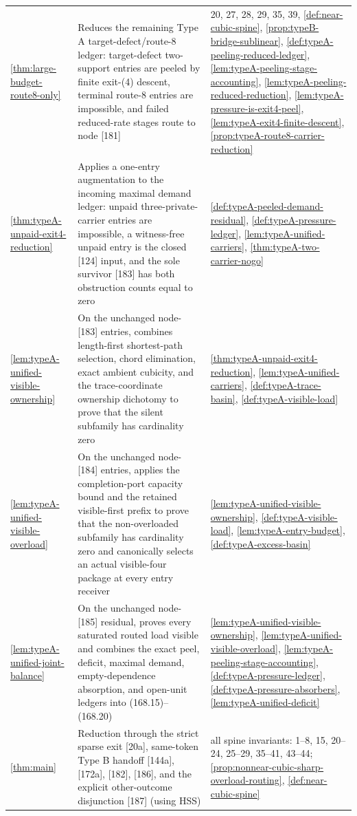 \documentclass[11pt]{article}
\begin{document}
{\begin{longtable}{L{0.31\textwidth} L{0.42\textwidth} L{0.17\textwidth}}
\cref{thm:large-budget-route8-only} & Reduces the remaining Type A target-defect/route-8 ledger: target-defect two-support entries are peeled by finite exit-\textup{(4)} descent, terminal route-8 entries are impossible, and failed reduced-rate stages route to node [181] & 20, 27, 28, 29, 35, 39, \cref{def:near-cubic-spine}, \cref{prop:typeB-bridge-sublinear}, \cref{def:typeA-peeling-reduced-ledger}, \cref{lem:typeA-peeling-stage-accounting}, \cref{lem:typeA-peeling-reduced-reduction}, \cref{lem:typeA-pressure-is-exit4-peel}, \cref{lem:typeA-exit4-finite-descent}, \cref{prop:typeA-route8-carrier-reduction} \\
\cref{thm:typeA-unpaid-exit4-reduction} & Applies a one-entry augmentation to the incoming maximal demand ledger: unpaid three-private-carrier entries are impossible, a witness-free unpaid entry is the closed [124] input, and the sole survivor [183] has both obstruction counts equal to zero & \cref{def:typeA-peeled-demand-residual}, \cref{def:typeA-pressure-ledger}, \cref{lem:typeA-unified-carriers}, \cref{thm:typeA-two-carrier-nogo} \\
\cref{lem:typeA-unified-visible-ownership} & On the unchanged node-[183] entries, combines length-first shortest-path selection, chord elimination, exact ambient cubicity, and the trace-coordinate ownership dichotomy to prove that the silent subfamily has cardinality zero & \cref{thm:typeA-unpaid-exit4-reduction}, \cref{lem:typeA-unified-carriers}, \cref{def:typeA-trace-basin}, \cref{def:typeA-visible-load} \\
\cref{lem:typeA-unified-visible-overload} & On the unchanged node-[184] entries, applies the completion-port capacity bound and the retained visible-first prefix to prove that the non-overloaded subfamily has cardinality zero and canonically selects an actual visible-four package at every entry receiver & \cref{lem:typeA-unified-visible-ownership}, \cref{def:typeA-visible-load}, \cref{lem:typeA-entry-budget}, \cref{def:typeA-excess-basin} \\
\cref{lem:typeA-unified-joint-balance} & On the unchanged node-[185] residual, proves every saturated routed load visible and combines the exact peel, deficit, maximal demand, empty-dependence absorption, and open-unit ledgers into \textup{(168.15)}--\textup{(168.20)} & \cref{lem:typeA-unified-visible-ownership}, \cref{lem:typeA-unified-visible-overload}, \cref{lem:typeA-peeling-stage-accounting}, \cref{def:typeA-pressure-ledger}, \cref{def:typeA-pressure-absorbers}, \cref{lem:typeA-unified-deficit} \\
\cref{thm:main} & Reduction through the strict sparse exit [20a], same-token Type B handoff [144a], [172a], [182], [186], and the explicit other-outcome disjunction [187] (using HSS) & all spine invariants: 1--8, 15, 20--24, 25--29, 35--41, 43--44; \cref{prop:nonnear-cubic-sharp-overload-routing}, \cref{def:near-cubic-spine} \\
\bottomrule
\end{longtable}
}
\end{document}
